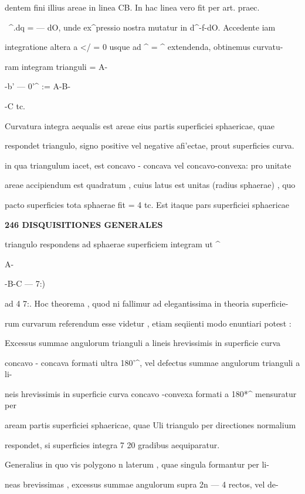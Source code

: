 \documentclass[12pt,a4paper]{article}
\begin{document}
{{{{{{{dentem  fini  illius  areae  in  linea  CB.  In  hac  linea  vero  fit  per  art.  praec.

~^.dq  =  —  dO,  unde  ex^pressio  nostra  mutatur  in  d^-f-dO.  Accedente  iam

integratione  altera  a  </  =  0  usque  ad  ^  =  ^  extendenda,  obtinemus  curvatu-

ram integram  trianguli    =  A-{-b' — 0'^  :=  A-\-B-{-C   tc.

Curvatura  integra  aequalis  est  areae  eius  partis  superficiei  sphaericae,  quae

respondet  triangulo,  signo  positive  vel  negative  afi'ectae,  prout  superficies  curva.

in  qua  triangulum  iacet,  est  concavo  -  concava  vel  concavo-convexa:  pro  unitate

areae  accipiendum  est  quadratum ,  cuius  latus  est  unitas  (radius  sphaerae) ,  quo

pacto  superficies  tota  sphaerae  fit    =  4  tc.      Est  itaque  pars  superficiei  sphaericae

\newpage
\setcounter{page}{246}

\noindent\textbf{246  DISQUISITIONES  GENERALES}\par

triangulo  respondens  ad  sphaerae  superficiem  integram  ut  ^{A-{-B-\-C — 7:)

ad  4  7:.  Hoc  theorema ,  quod  ni  fallimur  ad  elegantissima  in  theoria  superficie-

rum  curvarum  referendum  esse  videtur ,  etiam  seqiienti  modo  enuntiari  potest :

Excessus  summae  angulorum  trianguli  a  lineis  hrevissimis  in  superficie  curva

concavo  -  concava  formati  ultra  180'^,  vel  defectus  summae  angulorum  trianguli  a  li-

neis hrevissimis  in  superficie  curva  concavo -convexa  formati  a  180*^  mensuratur  per

aream  partis  superficiei  sphaericae,  quae  Uli  triangulo  per  directiones  normalium

respondet,  si  superficies  integra  7  20  gradibus  aequiparatur.

Generalius  in  quo  vis  polygono  n  laterum ,  quae  singula  formantur  per  li-

neas  brevissimas ,  excessus  summae  angulorum  supra  2n — 4  rectos,  vel  de-

}}}}}}}}}}}
\end{document}
